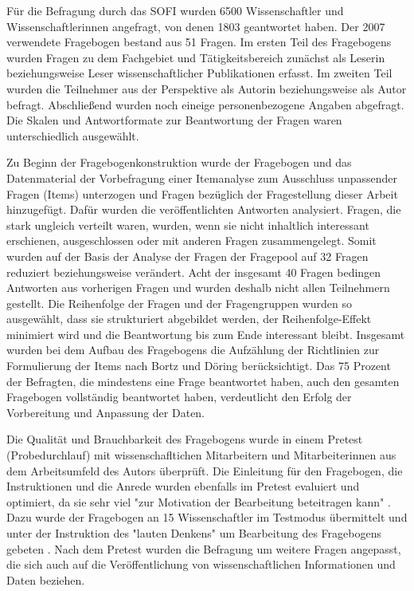 Für die Befragung durch das SOFI wurden 6500 Wissenschaftler und Wissenschaftlerinnen angefragt, von denen 1803 geantwortet haben. Der 2007 verwendete Fragebogen bestand aus 51 Fragen. Im ersten Teil des Fragebogens wurden Fragen zu dem Fachgebiet und Tätigkeitsbereich zunächst als Leserin beziehungsweise Leser wissenschaftlicher Publikationen erfasst. Im zweiten Teil wurden die Teilnehmer aus der Perspektive als Autorin beziehungsweise als Autor befragt. Abschließend wurden noch eineige personenbezogene Angaben abgefragt. \cite{Hanekop_Wittke_2007_Fragebogen} Die Skalen und Antwortformate zur Beantwortung der Fragen waren unterschiedlich ausgewählt.

Zu Beginn der Fragebogenkonstruktion wurde der Fragebogen und das Datenmaterial der Vorbefragung einer Itemanalyse zum Ausschluss unpassender Fragen (Items) unterzogen und Fragen bezüglich der Fragestellung dieser Arbeit hinzugefügt. Dafür wurden die veröffentlichten Antworten analysiert. Fragen, die stark ungleich verteilt waren, wurden, wenn sie nicht inhaltlich interessant erschienen, ausgeschlossen oder mit anderen Fragen zusammengelegt. Somit wurden auf der Basis der Analyse der Fragen der Fragepool auf 32 Fragen reduziert beziehungsweise verändert. Acht der insgesamt 40 Fragen bedingen Antworten aus vorherigen Fragen und wurden deshalb nicht allen Teilnehmern gestellt. Die Reihenfolge der Fragen und der Fragengruppen wurden so ausgewählt, dass sie strukturiert abgebildet werden, der Reihenfolge-Effekt minimiert wird und die Beantwortung bis zum Ende interessant bleibt. Insgesamt wurden bei dem Aufbau des Fragebogens die Aufzählung der Richtlinien zur Formulierung der Items nach Bortz und Döring \cite{raab_2012_fragebogen} berücksichtigt. Das 75 Prozent der Befragten, die mindestens eine Frage beantwortet haben, auch den gesamten Fragebogen vollständig beantwortet haben, verdeutlicht den Erfolg der Vorbereitung und Anpassung der Daten.

Die Qualität und Brauchbarkeit des Fragebogens wurde in einem Pretest (Probedurchlauf) mit wissenschafltichen Mitarbeitern und Mitarbeiterinnen aus dem Arbeitsumfeld des Autors überprüft. Die Einleitung für den Fragebogen, die Instruktionen und die Anrede wurden ebenfalls im Pretest evaluiert und optimiert, da sie sehr viel "zur Motivation der Bearbeitung beteitragen kann" \cite{raab_2012_fragebogen}. Dazu wurde der Fragebogen an 15 Wissenschaftler im Testmodus übermittelt und unter der Instruktion des "lauten Denkens" um Bearbeitung des Fragebogens gebeten \cite{raab_2012_fragebogen}. Nach dem Pretest wurden die Befragung um weitere Fragen angepasst, die sich auch auf die Veröffentlichung von wissenschaftlichen Informationen und Daten beziehen.

